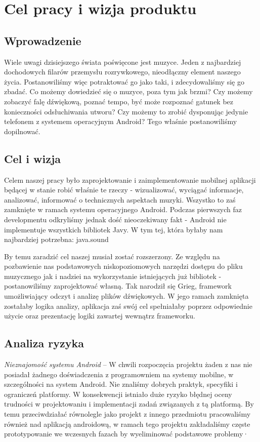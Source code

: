 \chapter{Cel pracy i wizja produktu}

\section{Wprowadzenie}
Wiele uwagi dzisiejszego świata poświęcone jest muzyce. Jeden z najbardziej dochodowych filarów przemysłu rozrywkowego, nieodłączny element naszego życia. Postanowiliśmy więc potraktować go jako taki, i zdecydowaliśmy się go zbadać. Co możemy dowiedzieć się o muzyce, poza tym jak brzmi? Czy możemy zobaczyć falę dźwiękową, poznać tempo, być może rozpoznać gatunek bez konieczności odsłuchiwania utworu? Czy możemy to zrobić dysponując jedynie telefonem z systemem operacyjnym Android? Tego właśnie postanowiliśmy dopilnować.
\section{Cel i wizja}
Celem naszej pracy było zaprojektowanie i zaimplementowanie mobilnej aplikacji będącej w stanie robić właśnie te rzeczy - wizualizować, wyciągać informacje, analizować, informować o technicznych aspektach muzyki. Wszystko to zaś zamknięte w ramach systemu operacyjnego Android. Podczas pierwszych faz developmentu odkryliśmy jednak dość nieoczekiwany fakt - Android nie implementuje wszystkich bibliotek Javy. W tym tej, która byłaby nam najbardziej potrzebna: java.sound

By temu zaradzić cel naszej musiał zostać rozszerzony. Ze względu na pozbawienie nas podstawowych niskopoziomowych narzędzi dostępu do pliku muzycznego jak i nadziei na wykorzystanie istniejących już bibliotek - postanowiliśmy zaprojektować własną. Tak narodził się Grieg, framework umożliwiający odczyt i analizę plików dźwiękowych. W jego ramach zamknięta zostałaby logika analizy, aplikacja zaś swój cel spełniałaby poprzez odpowiednie użycie oraz prezentację logiki zawartej wewnątrz frameworku.

\section{Analiza ryzyka}

\noindent\emph{Nieznajomość systemu Android} -- W chwili rozpoczęcia projektu żaden z nas nie posiadał żadnego doświadczenia z programowniem na systemy mobilne, w szczególności na system Android. Nie znaliśmy dobrych praktyk, specyfiki i ograniczeń platformy. W konsekwencji istniało duże ryzyko błędnej oceny trudności w projektowaniu i implementacji zadań związanych z tą platformą. By temu przeciwdziałać równolegle jako projekt z innego przedmiotu pracowaliśmy również nad aplikacją androidową, w ramach tego projektu zakładaliśmy częste prototypowanie we wczesnych fazach by wyeliminować podstawowe problemy·


